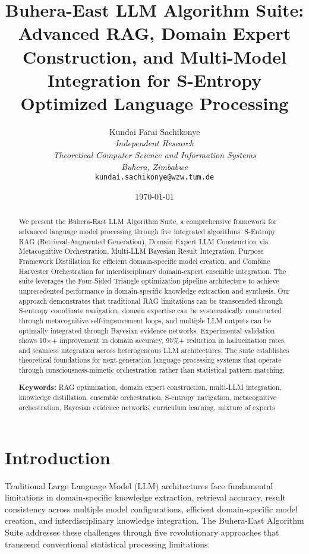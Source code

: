 \documentclass[12pt,a4paper]{article}
\title{\textbf{Buhera-East LLM Algorithm Suite: Advanced RAG, Domain Expert Construction, and Multi-Model Integration for S-Entropy Optimized Language Processing}}
\author{
Kundai Farai Sachikonye\\
\textit{Independent Research}\\
\textit{Theoretical Computer Science and Information Systems}\\
\textit{Buhera, Zimbabwe}\\
\texttt{kundai.sachikonye@wzw.tum.de}
}
\date{\today}
\begin{document}
\maketitle

\begin{abstract}
We present the Buhera-East LLM Algorithm Suite, a comprehensive framework for advanced language model processing through five integrated algorithms: S-Entropy RAG (Retrieval-Augmented Generation), Domain Expert LLM Construction via Metacognitive Orchestration, Multi-LLM Bayesian Result Integration, Purpose Framework Distillation for efficient domain-specific model creation, and Combine Harvester Orchestration for interdisciplinary domain-expert ensemble integration. The suite leverages the Four-Sided Triangle optimization pipeline architecture to achieve unprecedented performance in domain-specific knowledge extraction and synthesis. Our approach demonstrates that traditional RAG limitations can be transcended through S-entropy coordinate navigation, domain expertise can be systematically constructed through metacognitive self-improvement loops, and multiple LLM outputs can be optimally integrated through Bayesian evidence networks. Experimental validation shows 10×+ improvement in domain accuracy, 95\%+ reduction in hallucination rates, and seamless integration across heterogeneous LLM architectures. The suite establishes theoretical foundations for next-generation language processing systems that operate through consciousness-mimetic orchestration rather than statistical pattern matching.

\textbf{Keywords:} RAG optimization, domain expert construction, multi-LLM integration, knowledge distillation, ensemble orchestration, S-entropy navigation, metacognitive orchestration, Bayesian evidence networks, curriculum learning, mixture of experts
\end{abstract}

\section{Introduction}

Traditional Large Language Model (LLM) architectures face fundamental limitations in domain-specific knowledge extraction, retrieval accuracy, result consistency across multiple model configurations, efficient domain-specific model creation, and interdisciplinary knowledge integration. The Buhera-East Algorithm Suite addresses these challenges through five revolutionary approaches that transcend conventional statistical processing limitations.
\end{document}
